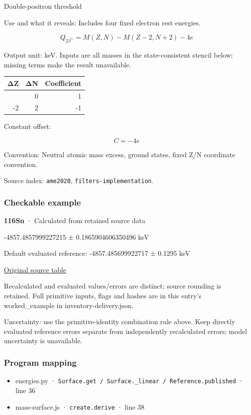 \documentclass[
  11pt,
  letterpaper,
]{article}
\providecommand{\tightlist}{%
  \setlength{\itemsep}{0pt}\setlength{\parskip}{0pt}}
\begin{document}
Double-positron threshold

Use and what it reveals: Includes four fixed electron rest energies.

\[
Q_{2\beta^+}=M(Z,N)-M(Z-2,N+2)-4e
\]

Output unit: keV. Inputs are all masses in the state-consistent stencil
below; missing terms make the result unavailable.

\begin{longtable}[]{@{}rrr@{}}
\toprule\noalign{}
ΔZ & ΔN & Coefficient \\
\midrule\noalign{}
\endhead
\bottomrule\noalign{}
\endlastfoot
0 & 0 & 1 \\
-2 & 2 & -1 \\
\end{longtable}

Constant offset:

\[
C=-4e
\]

Convention: Neutral atomic mass excess, ground states, fixed Z/N
coordinate convention.

Source index: \texttt{ame2020}, \texttt{filters-implementation}.

\subsubsection{Checkable example}\label{checkable-example-13}

\textbf{116Sn} · Calculated from retained source data

-4857.4857999227215 ± 0.1865904606350496 keV

Default evaluated reference: -4857.485699922717 ± 0.1295 keV

\href{https://www-nds.iaea.org/amdc/ame2020/rct1.mas20.txt}{Original
source table}

Recalculated and evaluated values/errors are distinct; source rounding
is retained. Full primitive inputs, flags and hashes are in this entry's
worked\_example in inventory-delivery.json.

Uncertainty: use the primitive-identity combination rule above. Keep
directly evaluated reference errors separate from independently
recalculated errors; model uncertainty is unavailable.

\subsubsection{Program mapping}\label{program-mapping-13}

\begin{itemize}
\tightlist
\item
  energies.py ·
  \texttt{Surface.get\ /\ Surface.\_linear\ /\ Reference.published} ·
  line 36
\item
  mass-surface.js · \texttt{create.derive} · line 38
\end{itemize}
\end{document}
